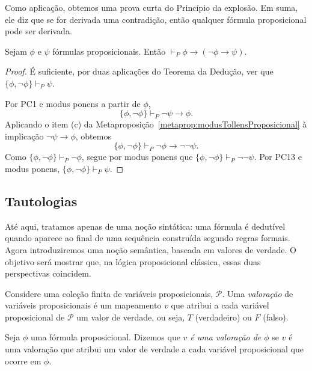 Como aplicação, obtemos uma prova curta do Princípio da explosão.
Em suma, ele diz que se for derivada uma contradição, então qualquer fórmula proposicional pode ser derivada.

\begin{metaproposition}\label{metaprop:principioExplosaoProposicional}Sejam $\phi$ e $\psi$ fórmulas proposicionais.
    Então $\vdash_P \phi\rightarrow(\neg \phi \rightarrow \psi)$.
\end{metaproposition}
\begin{proof}
    É suficiente, por duas aplicações do Teorema da Dedução, ver que $\{\phi, \neg \phi\} \vdash_P \psi$.

    Por PC1 e modus ponens a partir de $\phi$,
    \[
        \{\phi, \neg \phi\}\vdash_P \neg\psi\rightarrow\phi.
    \]
    Aplicando o item (c) da Metaproposição~\ref{metaprop:modusTollensProposicional} à implicação $\neg\psi\rightarrow\phi$, obtemos
    \[
        \{\phi, \neg \phi\}\vdash_P \neg\phi\rightarrow\neg\neg\psi.
    \]
    Como $\{\phi, \neg \phi\}\vdash_P \neg\phi$, segue por modus ponens que $\{\phi, \neg \phi\}\vdash_P \neg\neg\psi$.
    Por PC13 e modus ponens, $\{\phi, \neg \phi\}\vdash_P \psi$.
\end{proof}

\subsection{Tautologias}\label{subsec:tautologias}
Até aqui, tratamos apenas de uma noção sintática: uma fórmula é dedutível quando aparece ao final de uma sequência construída segundo regras formais.
Agora introduziremos uma noção semântica, baseada em valores de verdade.
O objetivo será mostrar que, na lógica proposicional clássica, essas duas perspectivas coincidem.

\begin{metadefinition}[Valoração]\label{mdef:valoracao}
    Considere uma coleção finita de variáveis proposicionais, $\mathcal P$.
    Uma \emph{valoração} de variáveis proposicionais é um mapeamento $v$ que atribui a cada variável proposicional de $\mathcal P$ um valor de verdade, ou seja, $T$ (verdadeiro) ou $F$ (falso).

    Seja $\phi$ uma fórmula proposicional.
    Dizemos que \emph{$v$ é uma valoração de $\phi$} se $v$ é uma valoração que atribui um valor de verdade a cada variável proposicional que ocorre em $\phi$.
\end{metadefinition}

